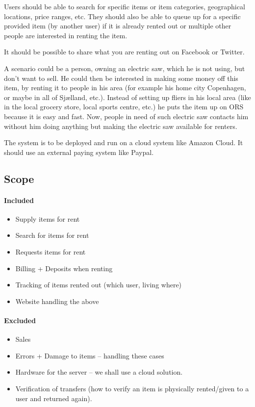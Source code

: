 \documentclass[a4paper,11pt]{report}
\begin{document}
Users should be able to search for specific items or item categories,
geographical locations, price ranges, etc. They should also be able to queue up
for a specific provided item (by another user) if it is already rented out or
multiple other people are interested in renting the item.

It should be possible to share what you are renting out on Facebook or Twitter.

A scenario could be a person, owning an electric saw, which he is not using, but
don't want to sell. He could then be interested in making some money off this
item, by renting it to people in his area (for example his home city Copenhagen,
or maybe in all of Sjælland, etc.). Instead of setting up fliers in his local
area (like in the local grocery store, local sports centre, etc.) he puts the
item up on ORS because it is easy and fast. Now, people in need of such electric
saw contacts him without him doing anything but making the electric saw
available for renters.

The system is to be deployed and run on a cloud system like Amazon Cloud. It
should use an external paying system like Paypal.

\subsection{Scope}
\paragraph{Included}
\begin{itemize}
\item Supply items for rent
\item Search for items for rent
\item Requests items for rent
\item Billing + Deposits when renting
\item Tracking of items rented out (which user, living where)
\item Website handling the above
\end{itemize}

\paragraph{Excluded}
\begin{itemize}
\item Sales
\item Errors + Damage to items -- handling these cases
\item Hardware for the server -- we shall use a cloud solution.
\item Verification of transfers (how to verify an item is physically rented/given to a user and returned again).
\end{itemize}
\end{document}
